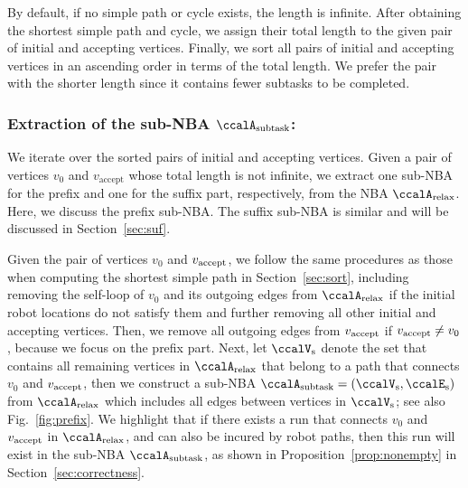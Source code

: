 \documentclass[Afour,sageh,times]{sagej}
\newcommand{\auto}[1]{\ccalA_{\textup{#1}}}
\newcommand{\vertex}[1]{v_{\textup{#1}}}
\begin{document}
{  By default, if no simple path or cycle exists, the length is infinite. After obtaining the shortest simple path and cycle, we assign their total length to the given pair of initial and accepting vertices.  Finally,  we sort all pairs of initial and accepting vertices in an ascending order in terms of the total length. We prefer the pair with the shorter length since it contains fewer subtasks to be completed.}


  \subsubsection{Extraction of the sub-NBA \upshape $\auto{subtask}$:}\label{sub-NBA:1}
We iterate over the sorted pairs of initial and accepting vertices. Given a pair of vertices  $v_0$ and $v_\text{accept}$ whose total length is not infinite,  we extract one sub-NBA for the prefix and one for the suffix part, respectively, from  the NBA $\auto{relax}$.  Here, we discuss the prefix sub-NBA. The suffix sub-NBA is similar and will be  discussed in Section~\ref{sec:suf}.

Given the pair of vertices $v_0$ and $\vertex{accept}$, we follow the same procedures as those when computing the shortest simple path in Section~\ref{sec:sort}, including removing the self-loop of $v_0$ and its outgoing edges from $\auto{relax}$ if the initial robot locations do not satisfy them and further removing all other initial and accepting vertices. Then, we remove all outgoing edges from $\vertex{accept}$ if $\vertex{accept} \not=v_0$, because we focus on the prefix part. Next, let $\ccalV_{\text{s}}$ denote the set that contains all remaining vertices in $ \auto{relax}$ that belong to a path that connects $v_0$ and $\vertex{accept}$, then we construct a sub-NBA $\auto{subtask}=(\ccalV_{\text{s}}, \ccalE_\text{s})$ from $\auto{relax}$ which includes all edges between vertices in $\ccalV_{\text{s}}$; see also Fig.~\ref{fig:prefix}. We highlight that if there exists a run that connects $v_0$ and $\vertex{accept}$ in $\auto{relax}$, and can also be incured by robot paths, then this run will exist in the sub-NBA $\auto{subtask}$, as shown in Proposition~\ref{prop:nonempty} in Section~\ref{sec:correctness}.
\end{document}
